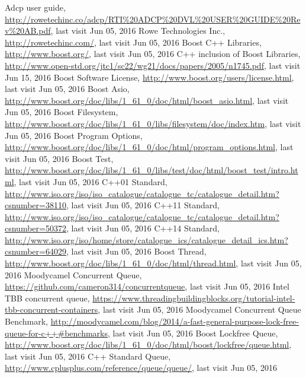 \begin{thebibliography}{99}

Adcp user guide, \url{http://rowetechinc.co/adcp/RTI%20ADCP%20DVL%20USER%20GUIDE%20Rev%20AB.pdf}, last visit Jun 05, 2016
Rowe Technologies Inc., \url{http://rowetechinc.com/}, last visit Jun 05, 2016
 Boost C++ Libraries, \url{http://www.boost.org/}, last visit Jun 05, 2016
 C++ inclusion of Boost Libraries, \url{http://www.open-std.org/jtc1/sc22/wg21/docs/papers/2005/n1745.pdf}, last visit Jun 15, 2016
 Boost Software License, \url{http://www.boost.org/users/license.html}, last visit Jun 05, 2016
 Boost Asio, \url{http://www.boost.org/doc/libs/1\_61\_0/doc/html/boost\_asio.html}, last visit Jun 05, 2016
 Boost Filesystem, \url{http://www.boost.org/doc/libs/1\_61\_0/libs/filesystem/doc/index.htm}, last visit Jun 05, 2016
 Boost Program Options, \url{http://www.boost.org/doc/libs/1\_61\_0/doc/html/program\_options.html}, last visit Jun 05, 2016
 Boost Test, \url{http://www.boost.org/doc/libs/1\_61\_0/libs/test/doc/html/boost\_test/intro.html}, last visit Jun 05, 2016
C++01 Standard, \url{http://www.iso.org/iso/iso_catalogue/catalogue_tc/catalogue_detail.htm?csnumber=38110}, last visit Jun 05, 2016
C++11 Standard, \url{http://www.iso.org/iso/iso_catalogue/catalogue_tc/catalogue_detail.htm?csnumber=50372}, last visit Jun 05, 2016
C++14 Standard, \url{http://www.iso.org/iso/home/store/catalogue_ics/catalogue_detail_ics.htm?csnumber=64029}, last visit Jun 05, 2016
 Boost Thread, \url{http://www.boost.org/doc/libs/1\_61\_0/doc/html/thread.html}, last visit Jun 05, 2016
 Moodycamel Concurrent Queue, \url{https://github.com/cameron314/concurrentqueue}, last visit Jun 05, 2016
 Intel TBB concurrent queue, \url{https://www.threadingbuildingblocks.org/tutorial-intel-tbb-concurrent-containers}, last visit Jun 05, 2016
 Moodycamel Concurrent Queue Benchmark, \url{http://moodycamel.com/blog/2014/a-fast-general-purpose-lock-free-queue-for-c++#benchmarks}, last visit Jun 05, 2016
 Boost Lockfree Queue, \url{http://www.boost.org/doc/libs/1_61_0/doc/html/boost/lockfree/queue.html}, last visit Jun 05, 2016
 C++ Standard Queue, \url{http://www.cplusplus.com/reference/queue/queue/}, last visit Jun 05, 2016

\end{thebibliography}
